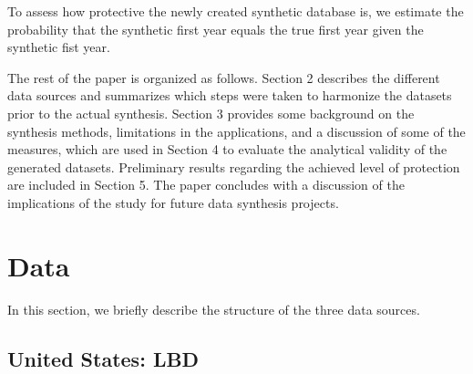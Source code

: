 \documentclass[10pt,twoside]{article}
\begin{document}
To assess how protective the newly created synthetic database is, we estimate the probability that the synthetic first year equals the true first year given the synthetic fist year.



The rest of the paper is organized as follows. Section 2 describes the different data sources and summarizes which steps were taken to harmonize the datasets prior to the actual synthesis. Section 3 provides some background on the synthesis methods, limitations in the applications, and a discussion of some of the measures, which are used in Section 4 to evaluate the analytical validity of the generated datasets. Preliminary results regarding the achieved level of protection are included in Section 5. The paper concludes with a discussion of the implications of the study for future data synthesis projects.
 
\section{Data} 
\label{sec:data}

In this section, we briefly describe the structure of the three data sources.

\subsection{United States: \acf{LBD}}
\end{document}
